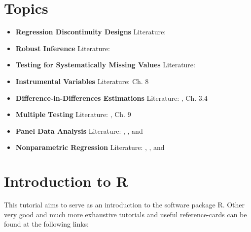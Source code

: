 \documentclass[
]{book}
\begin{document}
\hypertarget{topics}{%
\chapter*{Topics}\label{topics}}

\begin{itemize}
\item
  \textbf{Regression Discontinuity Designs}
  Literature: \citet{IL2008}
\item
  \textbf{Robust Inference}
  Literature: \citet{RobInf2011}
\item
  \textbf{Testing for Systematically Missing Values}
  Literature: \citet{L1988}
\item
  \textbf{Instrumental Variables}
  Literature: \citet{DMcK2004} Ch. 8
\item
  \textbf{Difference-in-Differences Estimations}
  Literature: \citet{DID_2004}, \citet{cerulli2015} Ch. 3.4
\end{itemize}

\begin{itemize}
\item
  \textbf{Multiple Testing}
  Literature: \citet{BHW2010}, \citet{Lehmann2006} Ch. 9
\item
  \textbf{Panel Data Analysis}
  Literature: \citet{H2014}, \citet{G2003}, and \citet{B2008}
\item
  \textbf{Nonparametric Regression}
  Literature: \citet{LR2007}, \citet{FG1996}, and \citet{WJ1994}
\end{itemize}

\hypertarget{introduction-to-r}{%
\chapter{Introduction to R}\label{introduction-to-r}}

This tutorial aims to serve as an introduction to the software package R. Other very good and much more exhaustive tutorials and useful reference-cards can be found at the following links:
\end{document}
